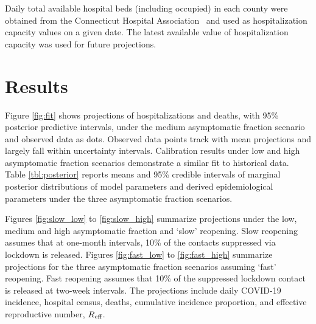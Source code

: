 \documentclass[11pt]{article}
\begin{document}

Daily total available hospital beds (including occupied) in each county were obtained from the Connecticut Hospital Association~\citep{CHAwebsite} and used as hospitalization capacity values on a given date. The latest available value of hospitalization capacity was used for future projections.







\section{Results}


Figure \ref{fig:fit} shows projections of hospitalizations and deaths, with 95\% posterior predictive intervals, under the medium asymptomatic fraction scenario and observed data as dots.  Observed data points track with mean projections and largely fall within uncertainty intervals.  Calibration results under low and high asymptomatic fraction scenarios demonstrate a similar fit to historical data.  
Table \ref{tbl:posterior} reports means and 95\% credible intervals of marginal posterior distributions of model parameters and derived epidemiological parameters under the three asymptomatic fraction scenarios.

Figures \ref{fig:slow_low} to \ref{fig:slow_high} summarize projections under the low, medium and high asymptomatic fraction and `slow' reopening. Slow reopening assumes that at one-month intervals, 10\% of the contacts suppressed via lockdown is released. Figures \ref{fig:fast_low} to \ref{fig:fast_high} summarize projections for the three asymptomatic fraction scenarios assuming `fast' reopening. Fast reopening assumes that 10\% of the suppressed lockdown contact is released at two-week intervals. The projections include daily COVID-19 incidence, hospital census, deaths, cumulative incidence proportion, and effective reproductive number, $R\textsubscript{eff}$. 
\end{document}
